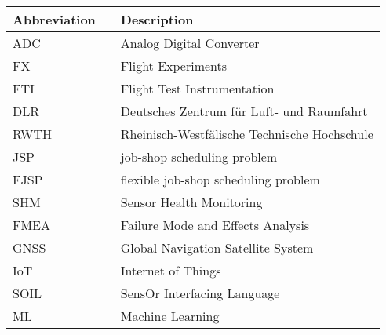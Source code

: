 \begin{table}[ht!]
	\begin{tabularx}{\dimexpr\textwidth}{p{6cm}p{0cm} X}
		\textbf{Abbreviation} && \textbf{Description}   \\ \midrule
		ADC && Analog Digital Converter\\[\rowheight]
		FX	&&	Flight Experiments	\\[\rowheight]
FTI	&&	Flight Test Instrumentation	\\[\rowheight]
DLR	&&	Deutsches Zentrum für Luft- und Raumfahrt	\\[\rowheight]
RWTH	&&	Rheinisch-Westfälische Technische Hochschule	\\[\rowheight]
JSP	&&	job-shop scheduling problem	\\[\rowheight]
FJSP	&&	flexible job-shop scheduling problem	\\[\rowheight]
SHM	&&	Sensor Health Monitoring	\\[\rowheight]
FMEA	&&	Failure Mode and Effects Analysis	\\[\rowheight]
GNSS	&&	Global Navigation Satellite System	\\[\rowheight]
IoT	&&	Internet of Things	\\[\rowheight]
SOIL	&&	SensOr Interfacing Language	\\[\rowheight]
ML	&&	Machine Learning	\\[\rowheight]

	\end{tabularx}
\end{table}

\loflot %
